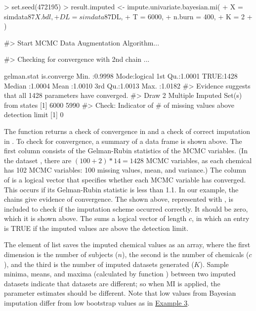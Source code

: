 \begin{Schunk}
\begin{Sinput}
> set.seed(472195)
> result.imputed <- impute.univariate.bayesian.mi(
+   X = simdata87$X.bdl, 
+   DL = simdata87$DL,
+   T = 6000,
+   n.burn = 400,
+   K = 2
+ )
\end{Sinput}
\begin{Soutput}
#> Start MCMC Data Augmentation Algorithm...
\end{Soutput}
\begin{Soutput}
#> Checking for convergence with 2nd chain ...
\end{Soutput}
\begin{Soutput}
  gelman.stat     is.converge   
 Min.   :0.9998   Mode:logical  
 1st Qu.:1.0001   TRUE:1428     
 Median :1.0004                 
 Mean   :1.0010                 
 3rd Qu.:1.0013                 
 Max.   :1.0182                 
#> Evidence suggests that all 1428 parameters have converged. 
#> Draw 2 Multiple Imputed Set(s) from states 
[1] 6000 5990
#> Check: Indicator of # of missing values above detection limit 
[1] 0
\end{Soutput}
\end{Schunk}

The  function returns a check of
convergence in  and a check of correct imputation in
. To check for convergence, a summary of a data
frame  is shown above. The first column consists of
the Gelman-Rubin statistics of the MCMC variables. (In the dataset
, there are \((100+2)*14 = 1428\) MCMC variables, as
each chemical has 102 MCMC variables: 100 missing values, mean, and
variance.) The  column of  is a
logical vector that specifies whether each MCMC variable has converged.
This occurs if its Gelman-Rubin statistic is less than 1.1. In our
example, the chains give evidence of convergence. The
 shown
above, represented with , is included to check if
the imputation scheme occurred correctly. It should be zero, which it is
shown above. The  sums a logical vector of length
\(c\), in which an entry is TRUE if the imputed values are above the
detection limit.

The element  of  list saves the
imputed chemical values as an array, where the first dimension is the
number of subjects (\(n\)), the second is the number of chemicals
(\(c\)), and the third is the number of imputed datasets generated
(\(K\)). Sample minima, means, and maxima (calculated by function
) between two imputed datasets indicate that datasets are
different; so when MI is applied, the parameter estimates should be
different. Note that low values from Bayesian imputation differ from low
bootstrap values as in \protect\hyperlink{Example-3}{Example 3}.

